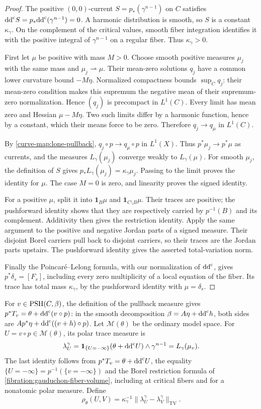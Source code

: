 \begin{proof}
The positive $(0,0)$-current $S=p_*(\gamma^{n-1})$ on $C$ satisfies
$\mathrm{dd}^{\mathrm{c}} S=p_*\mathrm{dd}^{\mathrm{c}}(\gamma^{n-1})=0$. A harmonic distribution is smooth,
so $S$ is a constant $\kappa_\gamma$. On the complement of the
critical values, smooth fiber integration identifies it with
the positive integral of $\gamma^{n-1}$ on a regular fiber.
Thus $\kappa_\gamma>0$.

First let $\mu$ be positive with mass $M>0$. Choose smooth
positive measures $\mu_j$ with the same mass and
$\mu_j\rightharpoonup\mu$. Their mean-zero solutions $q_j$ have
a common lower curvature bound $-M\eta$. Normalized compactness
bounds $\sup_Cq_j$: their mean-zero condition makes this
supremum the negative mean of their supremum-zero normalization.
Hence $(q_j)$ is precompact in $L^1(C)$. Every limit has mean
zero and Hessian $\mu-M\eta$. Two such limits differ by a
harmonic function, hence by a constant, which their means force
to be zero. Therefore $q_j\to q_\mu$ in $L^1(C)$.

By \cref{curve-map:lone-pullback}, $q_j\circ p\to q_\mu\circ p$
in $L^1(X)$. Thus $p^*\mu_j\to p^*\mu$ as currents, and the measures
$L_\gamma(\mu_j)$ converge weakly to $L_\gamma(\mu)$. For smooth $\mu_j$,
the definition of $S$ gives
$p_*L_\gamma(\mu_j)=\kappa_\gamma\mu_j$. Passing to the limit
proves the identity for $\mu$. The case $M=0$ is zero, and
linearity proves the signed identity.

For a positive $\mu$, split it into $\mathbf1_B\mu$ and
$\mathbf1_{C\setminus B}\mu$. Their traces are positive; the
pushforward identity shows that they are respectively carried
by $p^{-1}(B)$ and its complement. Additivity then gives the
restriction identity. Apply the same argument to the positive
and negative Jordan parts of a signed measure. Their disjoint
Borel carriers pull back to disjoint carriers, so their traces
are the Jordan parts upstairs. The pushforward identity gives
the asserted total-variation norm.

Finally the Poincar\'e--Lelong formula, with our normalization of $\mathrm{dd}^{\mathrm{c}}$,
gives $p^*\delta_s=[F_s]$, including every zero multiplicity of
a local equation of the fiber. Its trace has total mass
$\kappa_\gamma$, by the pushforward identity with $\mu=\delta_s$.
\end{proof}

For $v\in\mathrm{PSH}(C,\beta)$, the definition of the pullback measure
gives $p^*T_v=\theta+\mathrm{dd}^{\mathrm{c}}(v\circ p)$: in the smooth decomposition
$\beta=A\eta+\mathrm{dd}^{\mathrm{c}} h$, both sides are
$A p^*\eta+\mathrm{dd}^{\mathrm{c}}((v+h)\circ p)$.
Let $\mathcal M(\theta)$ be the ordinary model space. For
$U=v\circ p\in\mathcal M(\theta)$, its polar trace measure is
\[
 \lambda_U^\gamma
 =\mathbf1_{\{U=-\infty\}}
       (\theta+\mathrm{dd}^{\mathrm{c}} U)\wedge\gamma^{n-1}
 =L_\gamma(\mu_v).
\]
The last identity follows from $p^*T_v=\theta+\mathrm{dd}^{\mathrm{c}} U$, the equality
$\{U=-\infty\}=p^{-1}(\{v=-\infty\})$ and the Borel restriction formula of
\cref{fibration:gauduchon-fiber-volume}, including at critical
fibers and for a nonatomic polar measure. Define
\[
 \rho_\theta(U,V)=\kappa_\gamma^{-1}
                  \|\lambda_U^\gamma-\lambda_V^\gamma\|_{\mathrm{TV}}.
\]

